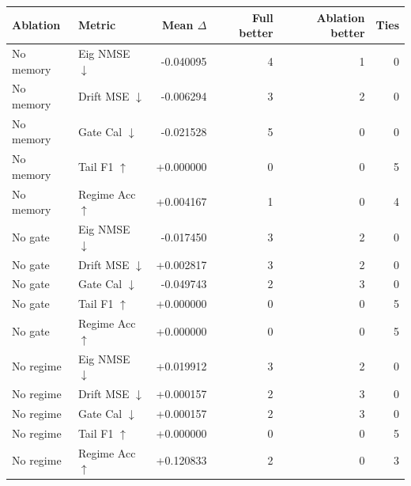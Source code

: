 \begin{tabular}{llrrrr}
\toprule
Ablation & Metric & Mean $\Delta$ & Full better & Ablation better & Ties \\
\midrule
No memory & Eig NMSE $\downarrow$ & -0.040095 & 4 & 1 & 0 \\
No memory & Drift MSE $\downarrow$ & -0.006294 & 3 & 2 & 0 \\
No memory & Gate Cal $\downarrow$ & -0.021528 & 5 & 0 & 0 \\
No memory & Tail F1 $\uparrow$ & +0.000000 & 0 & 0 & 5 \\
No memory & Regime Acc $\uparrow$ & +0.004167 & 1 & 0 & 4 \\
\addlinespace[2pt]
No gate & Eig NMSE $\downarrow$ & -0.017450 & 3 & 2 & 0 \\
No gate & Drift MSE $\downarrow$ & +0.002817 & 3 & 2 & 0 \\
No gate & Gate Cal $\downarrow$ & -0.049743 & 2 & 3 & 0 \\
No gate & Tail F1 $\uparrow$ & +0.000000 & 0 & 0 & 5 \\
No gate & Regime Acc $\uparrow$ & +0.000000 & 0 & 0 & 5 \\
\addlinespace[2pt]
No regime & Eig NMSE $\downarrow$ & +0.019912 & 3 & 2 & 0 \\
No regime & Drift MSE $\downarrow$ & +0.000157 & 2 & 3 & 0 \\
No regime & Gate Cal $\downarrow$ & +0.000157 & 2 & 3 & 0 \\
No regime & Tail F1 $\uparrow$ & +0.000000 & 0 & 0 & 5 \\
No regime & Regime Acc $\uparrow$ & +0.120833 & 2 & 0 & 3 \\
\bottomrule
\end{tabular}
